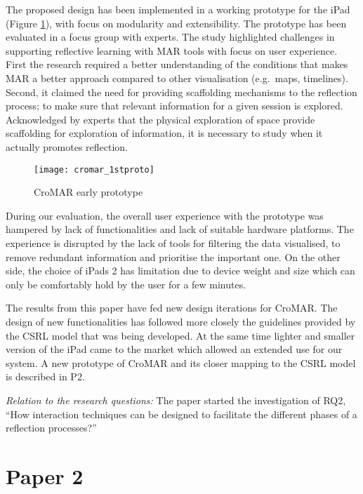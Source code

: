 The proposed design has been implemented in a working prototype for the iPad (Figure \ref{fig:cromar-prototype}), with focus on modularity and extensibility. The prototype has been evaluated in a focus group with experts. The study highlighted challenges in supporting reflective learning with MAR tools with focus on user experience. First the research required a better understanding of the conditions that makes MAR a better approach compared to other visualisation (e.g.~maps, timelines). Second, it claimed the need for providing scaffolding mechanisms to the reflection process; to make sure that relevant information for a given session is explored. Acknowledged by experts that the physical exploration of space provide scaffolding for exploration of information, it is necessary to study when it actually promotes reflection.
\begin{figure}
	[tbh] \centering 
	\texttt{[image: cromar\_1stproto]} \caption{CroMAR early prototype} \label{fig:cromar-prototype} 
\end{figure}

During our evaluation, the overall user experience with the prototype was hampered by lack of functionalities and lack of suitable hardware platforms. The experience is disrupted by the lack of tools for filtering the data visualised, to remove redundant information and prioritise the important one. On the other side, the choice of iPads 2 has limitation due to device weight and size which can only be comfortably hold by the user for a few minutes.

The results from this paper have fed new design iterations for CroMAR. The design of new functionalities has followed more closely the guidelines provided by the CSRL model that was being developed. At the same time lighter and smaller version of the iPad came to the market which allowed an extended use for our system. A new prototype of CroMAR and its closer mapping to the CSRL model is described in P2.

\emph{Relation to the research questions: } The paper started the investigation of RQ2, ``How interaction techniques can be designed to facilitate the different phases of a reflection processes?'' 

\section[Supporting Debriefing with Sensor Data: A Reflective Approach to Crisis Training]{Paper 2}\label{paper-2}


